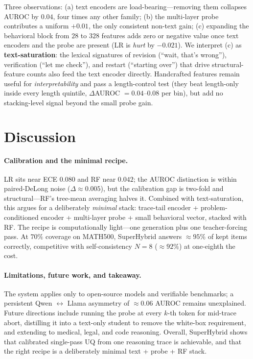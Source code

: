 \documentclass{article}
\begin{document}
Three observations: (a) text encoders are load-bearing---removing them
collapses AUROC by $0.04$, four times any other family; (b) the multi-layer
probe contributes a uniform $+0.01$, the only consistent non-text gain;
(c) expanding the behavioral block from $28$ to $328$ features adds zero or
negative value once text encoders and the probe are present (LR is
\emph{hurt} by $-0.021$). We interpret (c) as \textbf{text-saturation}: the
lexical signatures of revision (``wait, that's wrong''), verification
(``let me check''), and restart (``starting over'') that drive
structural-feature counts also feed the text encoder directly. Handcrafted
features remain useful for \emph{interpretability} and pass a length-control
test (they beat length-only inside every length quintile,
$\Delta$AUROC $= 0.04$--$0.08$ per bin), but add no stacking-level signal
beyond the small probe gain.

\section{Discussion}

\paragraph{Calibration and the minimal recipe.} LR sits near ECE $0.080$
and RF near $0.042$; the AUROC distinction is within paired-DeLong noise
($\Delta \approx 0.005$), but the calibration gap is two-fold and
structural---RF's tree-mean averaging halves it. Combined with
text-saturation, this argues for a deliberately
\emph{minimal} stack: trace-tail encoder + problem-conditioned encoder +
multi-layer probe + small behavioral vector, stacked with RF. The recipe is
computationally light---one generation plus one teacher-forcing pass. At
$70\%$ coverage on MATH500, SuperHybrid answers $\approx 95\%$ of kept
items correctly, competitive with self-consistency $N\!=\!8$
($\approx 92\%$) at one-eighth the cost.

\paragraph{Limitations, future work, and takeaway.} The system applies
only to open-source models and verifiable benchmarks; a persistent
Qwen $\leftrightarrow$ Llama asymmetry of $\approx 0.06$ AUROC remains
unexplained. Future directions include running the probe at every $k$-th
token for mid-trace abort, distilling it into a text-only student to
remove the white-box requirement, and extending to medical, legal, and
code reasoning. Overall, SuperHybrid shows that calibrated single-pass UQ from one
reasoning trace is achievable, and that the right recipe is a deliberately
minimal text + probe + RF stack.
\end{document}
